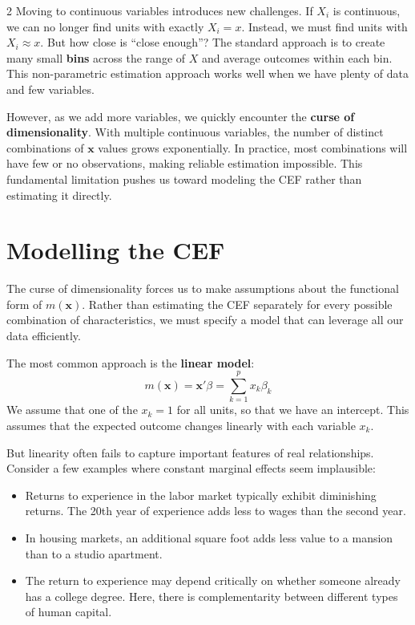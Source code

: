\documentclass[12pt]{article}
\begin{document}
\begin{multicols}{2}
  Moving to continuous variables introduces new challenges.
  If $X_i$ is continuous, we can no longer find units with exactly $X_i = x$.
  Instead, we must find units with $X_i \approx x$.
  But how close is ``close enough''?
  The standard approach is to create many small \textbf{bins} across the range of $X$ and average outcomes within each bin.
  This non-parametric estimation approach works well when we have plenty of data and few variables.

  However, as we add more variables, we quickly encounter the \textbf{curse of dimensionality}.
  With multiple continuous variables, the number of distinct combinations of $\bm{x}$ values grows exponentially.
  In practice, most combinations will have few or no observations, making reliable estimation impossible.
  This fundamental limitation pushes us toward modeling the CEF rather than estimating it directly.

  \section*{Modelling the CEF}

  The curse of dimensionality forces us to make assumptions about the functional form of $m(\bm{x})$.
  Rather than estimating the CEF separately for every possible combination of characteristics, we must specify a model that can leverage all our data efficiently.

  The most common approach is the \textbf{linear model}:
  $$
  m(\bm{x}) = \bm{x}' \beta = \sum_{k=1}^p x_{k} \beta_k
  $$
  We assume that one of the $x_k = 1$ for all units, so that we have an intercept.
  This assumes that the expected outcome changes linearly with each variable $x_k$.

  But linearity often fails to capture important features of real relationships.
  Consider a few examples where constant marginal effects seem implausible:
  \begin{itemize}
    \item Returns to experience in the labor market typically exhibit diminishing returns.
      The 20th year of experience adds less to wages than the second year.

    \item In housing markets, an additional square foot adds less value to a mansion than to a studio apartment.

    \item The return to experience may depend critically on whether someone already has a college degree.
      Here, there is complementarity between different types of human capital.
  \end{itemize}


\end{multicols}
\end{document}
